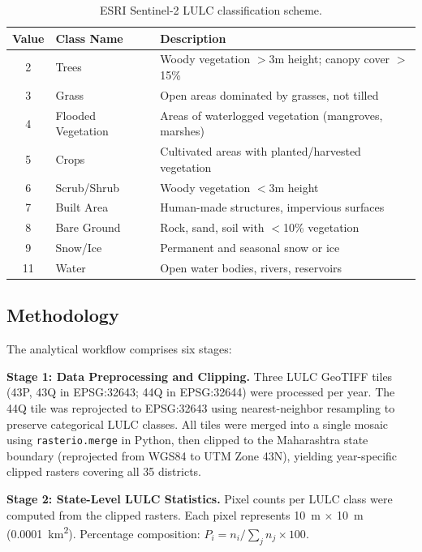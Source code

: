 \documentclass[12pt,a4paper]{article}
\begin{document}
\begin{table}[H]
\centering
\caption{ESRI Sentinel-2 LULC classification scheme.}
\label{tab:lulc_classes}
\begin{tabular}{clp{8cm}}
\toprule
\textbf{Value} & \textbf{Class Name} & \textbf{Description} \\
\midrule
2  & Trees             & Woody vegetation $>$3m height; canopy cover $>$15\% \\
3  & Grass             & Open areas dominated by grasses, not tilled \\
4  & Flooded Vegetation & Areas of waterlogged vegetation (mangroves, marshes) \\
5  & Crops             & Cultivated areas with planted/harvested vegetation \\
6  & Scrub/Shrub       & Woody vegetation $<$3m height \\
7  & Built Area        & Human-made structures, impervious surfaces \\
8  & Bare Ground       & Rock, sand, soil with $<$10\% vegetation \\
9  & Snow/Ice          & Permanent and seasonal snow or ice \\
11 & Water             & Open water bodies, rivers, reservoirs \\
\bottomrule
\end{tabular}
\end{table}

\subsection{Methodology}

The analytical workflow comprises six stages:

\textbf{Stage 1: Data Preprocessing and Clipping.}
Three LULC GeoTIFF tiles (43P, 43Q in EPSG:32643; 44Q in EPSG:32644) were processed per year. The 44Q tile was reprojected to EPSG:32643 using nearest-neighbor resampling to preserve categorical LULC classes. All tiles were merged into a single mosaic using \texttt{rasterio.merge} in Python, then clipped to the Maharashtra state boundary (reprojected from WGS84 to UTM Zone 43N), yielding year-specific clipped rasters covering all 35 districts.

\textbf{Stage 2: State-Level LULC Statistics.}
Pixel counts per LULC class were computed from the clipped rasters. Each pixel represents 10~m $\times$ 10~m (0.0001~km\textsuperscript{2}). Percentage composition: $P_i = n_i / \sum_j n_j \times 100$.
\end{document}
